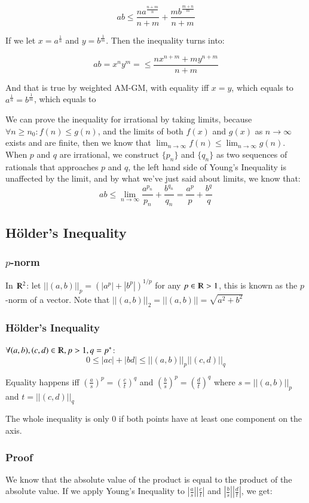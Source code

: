 \documentclass [12 pt, twoside] {book}
\newcommand\+{\text{ }}
\begin{document}
$$ab \leq \frac{na^{\frac{n + m}{n}} }{n + m} + \frac{mb^{\frac{m + n}{m}} }{n + m}$$

If we let $x = a^{\frac{1}{n}}$ and $y = b^{\frac{1}{m}}$. Then the inequality
turns into:

$$ab = x^ny^m = \leq \frac{nx^{n + m} + my^{n + m}}{n + m}$$

And that is true by weighted AM-GM, with equality iff $x = y$, which equals to
$a^{\frac{1}{n}} = b^{\frac{1}{m}}$, which equals to 

We can prove the inequality for irrational by taking limits, because
$\forall n \geq n_0: f(n) \leq g(n)$, and the limits of both $f(x)$ and $g(x)$ as
$n\to\infty$ exists and are finite, then we know that $\lim_{n\to\infty}f(n)
\leq \lim_{n\to\infty} g(n)$. When $p$ and $q$ are irrational, we construct
$\{p_n\}$ and $\{q_n\}$ as two sequences of rationals that approaches $p$ and
$q$, the left hand side of Young's Inequality is unaffected by the limit, and by
what we've just said about limits, we know that:
$$ab \leq \lim_{n\to\infty} \frac{a^{p_n}}{p_n} + \frac{b^{q_n}}{q_n} =
\frac{a^p}{p} + \frac{b^q}{q}$$

\subsection{H\"{o}lder's Inequality}
\subsubsection{$p$-norm}
In $\varmathbb{R}^2$: let $||(a, b)||_p = (|a^p| + |b^p|)^{1/p}$ for any $p \in
\varmathbb{R} > 1$, this is known as the $p$-norm of a vector. Note that $||(a,
b)||_2 = ||(a, b)|| = \sqrt{a^2 + b^2}$

\subsubsection{H\"{o}lder's Inequality}
$\forall (a, b), (c, d) \in \varmathbb{R^2}, p > 1, q = p^*$:
$$0 \leq |ac| + |bd| \leq ||(a, b)||_p||(c, d)||_q$$

Equality happens iff $(\frac{a}{s})^p = (\frac{c}{t})^q$ and $(\frac{b}{s})^p =
(\frac{d}{t})^q$ where $s = ||(a, b)||_p$ and $t = ||(c, d)||_q$

The whole inequality is only 0 if both points have at least one component on the
axis.

\subsubsection{Proof}
We know that the absolute value of the product is equal to the product of the
absolute value. If we apply Young's Inequality to $|\frac{a}{s}||\frac{c}{t}|$
and $\left|\frac{b}{s}\right|\left|\frac{d}{t}\right|$, we get:
\end{document}
